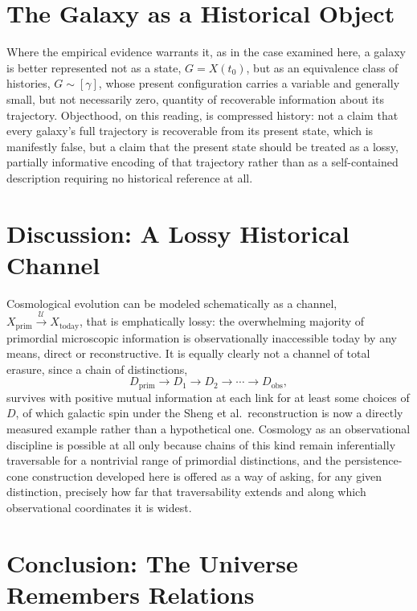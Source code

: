 \documentclass[11pt]{article}
\begin{document}
\section{The Galaxy as a Historical Object}

Where the empirical evidence warrants it, as in the case examined here, a galaxy is better represented not as a state, $G = X(t_0)$, but as an equivalence class of histories, $G \sim [\gamma]$, whose present configuration carries a variable and generally small, but not necessarily zero, quantity of recoverable information about its trajectory. Objecthood, on this reading, is compressed history: not a claim that every galaxy's full trajectory is recoverable from its present state, which is manifestly false, but a claim that the present state should be treated as a lossy, partially informative encoding of that trajectory rather than as a self-contained description requiring no historical reference at all.

\section{Discussion: A Lossy Historical Channel}

Cosmological evolution can be modeled schematically as a channel, $X_{\mathrm{prim}} \xrightarrow{\mathcal U} X_{\mathrm{today}}$, that is emphatically lossy: the overwhelming majority of primordial microscopic information is observationally inaccessible today by any means, direct or reconstructive. It is equally clearly not a channel of total erasure, since a chain of distinctions,
\begin{equation}
D_{\mathrm{prim}} \to D_1 \to D_2 \to \cdots \to D_{\mathrm{obs}},
\end{equation}
survives with positive mutual information at each link for at least some choices of $D$, of which galactic spin under the Sheng et al.\ reconstruction is now a directly measured example rather than a hypothetical one. Cosmology as an observational discipline is possible at all only because chains of this kind remain inferentially traversable for a nontrivial range of primordial distinctions, and the persistence-cone construction developed here is offered as a way of asking, for any given distinction, precisely how far that traversability extends and along which observational coordinates it is widest.

\section{Conclusion: The Universe Remembers Relations}
\end{document}
